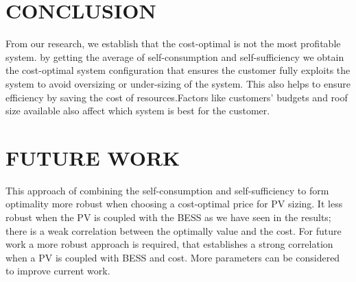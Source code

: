 \documentclass[sigconf,12pt,nonacm]{acmart}
\begin{document}
\section{CONCLUSION}
From our research, we establish that the cost-optimal is not the most profitable system. by getting the average of self-consumption and self-sufficiency we obtain the cost-optimal system configuration that ensures the customer fully exploits the system to avoid oversizing or under-sizing of the system. This also helps to ensure efficiency by saving the cost of resources\cite{dorsey_2019_energy}.Factors like customers' budgets and roof size available also affect which system is best for the customer. 

\section{FUTURE WORK}
This approach of combining the self-consumption and self-sufficiency to form optimality more robust when choosing a cost-optimal price for PV sizing. It less robust when the PV is coupled with the  BESS as we have seen in the results; there is a weak correlation between the optimally value and the cost. For future work a more robust approach is required, that establishes a strong correlation when a PV is coupled with BESS and cost. More parameters can be considered to improve current work.


\end{document}
